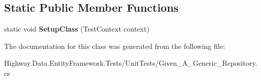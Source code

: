 \subsection*{Static Public Member Functions}
\begin{DoxyCompactItemize}
\item 
\hypertarget{class_highway_1_1_data_1_1_entity_framework_1_1_tests_1_1_unit_tests_1_1_given___a___generic___repository_aa84526ae08a856e159305f7f0a73a515}{static void {\bfseries Setup\-Class} (Test\-Context context)}\label{class_highway_1_1_data_1_1_entity_framework_1_1_tests_1_1_unit_tests_1_1_given___a___generic___repository_aa84526ae08a856e159305f7f0a73a515}

\end{DoxyCompactItemize}


The documentation for this class was generated from the following file\-:\begin{DoxyCompactItemize}
\item 
Highway.\-Data.\-Entity\-Framework.\-Tests/\-Unit\-Tests/Given\-\_\-\-A\-\_\-\-Generic\-\_\-\-Repository.\-cs\end{DoxyCompactItemize}
